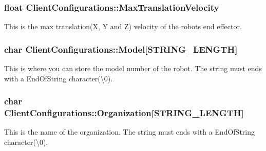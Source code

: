 \subsubsection[{\texorpdfstring{Max\+Translation\+Velocity}{MaxTranslationVelocity}}]{\setlength{\rightskip}{0pt plus 5cm}float Client\+Configurations\+::\+Max\+Translation\+Velocity}\hypertarget{struct_client_configurations_a85ae51f1716500dd154f0ce279b78a47}{}\label{struct_client_configurations_a85ae51f1716500dd154f0ce279b78a47}


This is the max translation(\+X, Y and Z) velocity of the robot\textquotesingle{}s end effector. 

\subsubsection[{\texorpdfstring{Model}{Model}}]{\setlength{\rightskip}{0pt plus 5cm}char Client\+Configurations\+::\+Model\mbox{[}{\bf S\+T\+R\+I\+N\+G\+\_\+\+L\+E\+N\+G\+TH}\mbox{]}}\hypertarget{struct_client_configurations_a5bb86440679384635d0d0f41ca431249}{}\label{struct_client_configurations_a5bb86440679384635d0d0f41ca431249}


This is where you can store the model number of the robot. The string must ends with a End\+Of\+String character(\textbackslash{}0). 

\subsubsection[{\texorpdfstring{Organization}{Organization}}]{\setlength{\rightskip}{0pt plus 5cm}char Client\+Configurations\+::\+Organization\mbox{[}{\bf S\+T\+R\+I\+N\+G\+\_\+\+L\+E\+N\+G\+TH}\mbox{]}}\hypertarget{struct_client_configurations_a55c82eb4163582b31c6d720766057767}{}\label{struct_client_configurations_a55c82eb4163582b31c6d720766057767}


This is the name of the organization. The string must ends with a End\+Of\+String character(\textbackslash{}0). 

